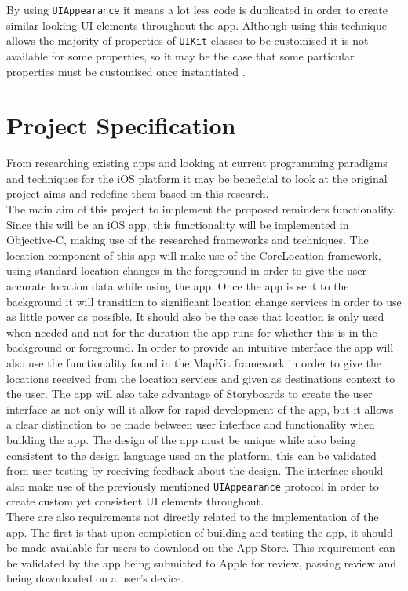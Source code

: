 \documentclass[12pt]{report}
\begin{document}
By using \texttt{UIAppearance} it means a lot less code is duplicated in order to create similar looking UI elements throughout the app. Although using this technique allows the majority of properties of \texttt{UIKit} classes to be customised it is not available for some properties, so it may be the case that some particular properties must be customised once instantiated \cite{gist}.

\section{Project Specification}

From researching existing apps and looking at current programming paradigms and techniques for the iOS platform it may be beneficial to look at the original project aims and redefine them based on this research.\\

The main aim of this project to implement the proposed reminders functionality. Since this will be an iOS app, this functionality will be implemented in Objective-C, making use of the researched frameworks and techniques. The location component of this app will make use of the CoreLocation framework, using standard location changes in the foreground in order to give the user accurate location data while using the app. Once the app is sent to the background it will transition to significant location change services in order to use as little power as possible. It should also be the case that location is only used when needed and not for the duration the app runs for whether this is in the background or foreground. In order to provide an intuitive interface the app will also use the functionality found in the MapKit framework in order to give the locations received from the location services and given as destinations context to the user. The app will also take advantage of Storyboards to create the user interface as not only will it allow for rapid development of the app, but it allows a clear distinction to be made between user interface and functionality when building the app. The design of the app must be unique while also being consistent to the design language used on the platform, this can be validated from user testing by receiving feedback about the design. The interface should also make use of the previously mentioned \texttt{UIAppearance} protocol in order to create custom yet consistent UI elements throughout.\\

There are also requirements not directly related to the implementation of the app. The first is that upon completion of building and testing the app, it should be made available for users to download on the App Store. This requirement can be validated by the app being submitted to Apple for review, passing review and being downloaded on a user's device.
\end{document}
